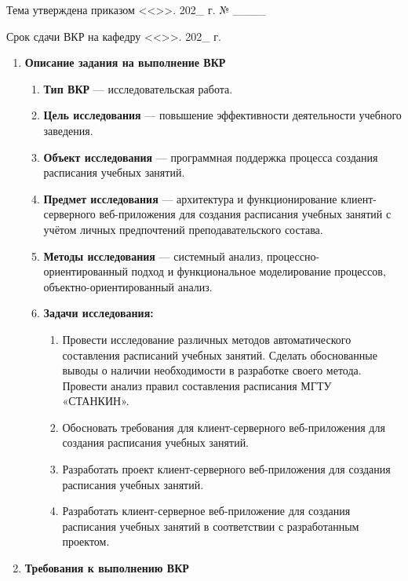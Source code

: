 \vfill

\noindent Тема утверждена приказом <<\underline{\hspace{7mm}}>>.\underline{\hspace{30mm}} 202\_ г. № \_\_\_\_

\noindent Срок сдачи ВКР на кафедру <<\underline{\hspace{7mm}}>>.\underline{\hspace{30mm}} 202\_ г.

\newpage
\fontsize{12pt}{16pt}
\selectfont
\begin{enumerate} [nosep,font=\bfseries, left=0pt]
	\item \textbf{Описание задания на выполнение ВКР }
		\begin{enumerate} [nosep, label*=\arabic*.,font=\bfseries]
			\item \textbf{Тип ВКР} --- исследовательская работа.
			\item \textbf{Цель исследования} --- повышение эффективности деятельности учебного заведения.
			\item \textbf{Объект исследования} --- программная поддержка процесса создания расписания учебных занятий.
			\item \textbf{Предмет исследования} --- архитектура и функционирование клиент-серверного веб-приложения для создания расписания учебных занятий с учётом личных предпочтений преподавательского состава.
			\item \textbf{Методы исследования} ---  системный анализ, процессно-ориентированный подход и функциональное моделирование процессов, объектно-ориентированный анализ.
			\item \textbf{Задачи исследования:}
				\begin{enumerate} [nosep, label*=\arabic*.]
					\item Провести исследование различных методов автоматического составления расписаний учебных занятий. Сделать обоснованные выводы о наличии необходимости в разработке своего метода. Провести анализ правил составления расписания МГТУ «СТАНКИН».
					\item Обосновать требования для клиент-серверного веб-приложения для создания расписания учебных занятий.
					\item Разработать проект клиент-серверного веб-приложения для создания расписания учебных занятий.
					\item Разработать клиент-серверное веб-приложение для создания расписания учебных занятий в соответствии с разработанным проектом.
				\end{enumerate}
		\end{enumerate}
	\item \textbf{Требования к выполнению ВКР}
		\begin{enumerate} [nosep, label*=\arabic*.,font=\bfseries]


\end{enumerate}
\end{enumerate}

